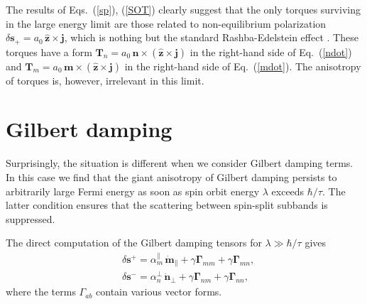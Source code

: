 \documentclass[%
  twocolumn,
  aps,
  prb,
  amsmath,
  amssymb,
  superscriptaddress,
  nofootinbib,
  floatfix
]{revtex4-1}
\newcommand{\beml}{\begin{subequations}}
\newcommand{\eml}{\end{subequations}}
\newcommand{\bb}{\boldsymbol}
\newcommand{\0}{^{\phantom{\dagger}}}
\begin{document}
The results of Eqs.~(\ref{sp}), (\ref{SOT}) clearly suggest that the only torques surviving in the large energy limit are those related to non-equilibrium polarization $\delta\bb{s}_+=a_0 \,\hat{\bb{z}}\times\bb{j}$, which is nothing but the standard Rashba-Edelstein effect \cite{Edelstein1990}. These torques have a form $\bb{T}_n= a_0 \,\bb{n}\times(\hat{\bb{z}}\times\bb{j})$ in the right-hand side of Eq.~(\ref{ndot}) and $\bb{T}_m= a_0 \,\bb{m}\times(\hat{\bb{z}}\times\bb{j})$ in the right-hand side of Eq.~(\ref{mdot}). The anisotropy of torques is, however, irrelevant in this limit.  

\section{Gilbert damping}\label{sec:gd}

Surprisingly, the situation is different when we consider Gilbert damping terms. In this case we find that the giant anisotropy of Gilbert damping persists to arbitrarily large Fermi energy as soon as spin orbit energy $\lambda$ exceeds $\hbar/\tau$. The latter condition ensures that the scattering between spin-split subbands is suppressed. 

The direct computation of the Gilbert damping tensors for $\lambda\gg \hbar/\tau$ gives
\beml
\label{gilbert}
\begin{align}
&\delta\bb{s}^+= \alpha_m^\parallel\,\dot{\bb{m}}_\parallel + \gamma \bb{\Gamma}_{mm}+ \gamma\bb{\Gamma}_{mn},\\
&\delta\bb{s}^-= \alpha_n^\perp\,\dot{\bb{n}}_\perp +\gamma \bb{\Gamma}_{nm}+\gamma \bb{\Gamma}_{nn},
\end{align}
\eml
where the terms $\Gamma_{ab}$ contain various vector forms. 
\end{document}
